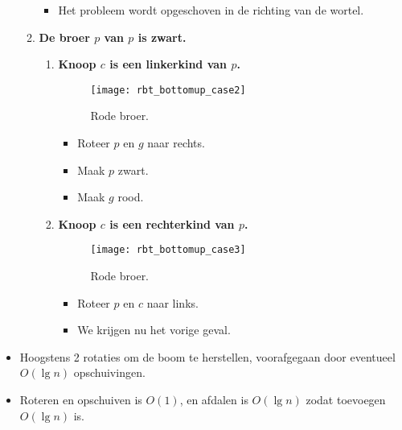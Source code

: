 \begin{itemize}
\begin{enumerate}
\begin{itemize}
            \item Het probleem wordt opgeschoven in de richting van de wortel.
        \end{itemize}
        \item \textbf{De broer $p$ van $p$ is zwart.}
        \begin{enumerate}
            \item \textbf{Knoop $c$ is een linkerkind van $p$.}
            \begin{figure}[ht]
                \centering
                \texttt{[image: rbt\_bottomup\_case2]}
                \caption{Rode broer.}
                \label{fig:rbt_bottomup_case2}
            \end{figure}
            \begin{itemize}
                \item Roteer $p$ en $g$ naar rechts. 
                \item Maak $p$ zwart.
                \item Maak $g$ rood.
            \end{itemize}
            \item \textbf{Knoop $c$ is een rechterkind van $p$.}
            \begin{figure}[ht]
                \centering
                \texttt{[image: rbt\_bottomup\_case3]}
                \caption{Rode broer.}
                \label{fig:rbt_bottomup_case3}
            \end{figure}
            \begin{itemize}
                \item Roteer $p$ en $c$ naar links.
                \item We krijgen nu het vorige geval.
            \end{itemize}
        \end{enumerate}
    \end{enumerate}
    \item Hoogstens 2 rotaties om de boom te herstellen, voorafgegaan door eventueel $O(\lg n)$ opschuivingen.
    \item Roteren en opschuiven is $O(1)$, en afdalen is $O(\lg n)$ zodat toevoegen $O(\lg n)$ is.
\end{itemize}


